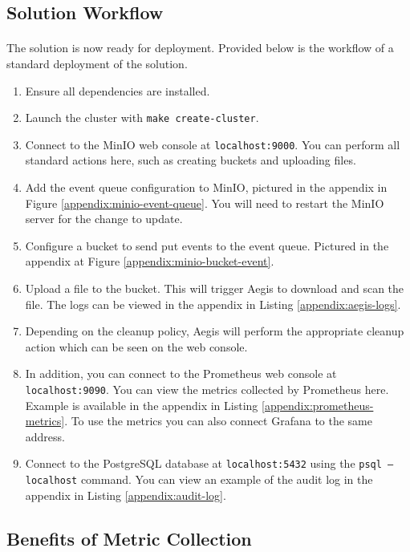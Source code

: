 \documentclass[12pt, conference, final, a4paper, onecolumn, compsoc]{IEEEtran}
\begin{document}
\subsection{Solution Workflow}
\paragraph{}
The solution is now ready for deployment. Provided below is the workflow of a
standard deployment of the solution.

\begin{enumerate}
  \item Ensure all dependencies are installed.
  \item Launch the cluster with \texttt{make create-cluster}.
  \item Connect to the MinIO web console at \texttt{localhost:9000}. You can
        perform all standard actions here, such as creating buckets and
        uploading files.
  \item Add the event queue configuration to MinIO, pictured in the appendix in Figure
        \ref{appendix:minio-event-queue}. You will need to restart the MinIO
        server for the change to update.
  \item Configure a bucket to send put events to the event queue. Pictured in
        the appendix at Figure \ref{appendix:minio-bucket-event}.
  \item Upload a file to the bucket. This will trigger Aegis to download and
        scan the file. The logs can be viewed in the appendix in Listing
        \ref{appendix:aegis-logs}.
  \item Depending on the cleanup policy, Aegis will perform the appropriate
        cleanup action which can be seen on the web console.
  \item In addition, you can connect to the Prometheus web console at
        \texttt{localhost:9090}. You can view the metrics collected by
        Prometheus here. Example is available in the appendix in Listing
        \ref{appendix:prometheus-metrics}. To use the metrics you can also
        connect Grafana to the same address.
  \item Connect to the PostgreSQL database at \texttt{localhost:5432} using the
        \texttt{psql --localhost} command. You can view an example of the audit
        log in the appendix in Listing \ref{appendix:audit-log}.
\end{enumerate}

\subsection{Benefits of Metric Collection}
\end{document}
